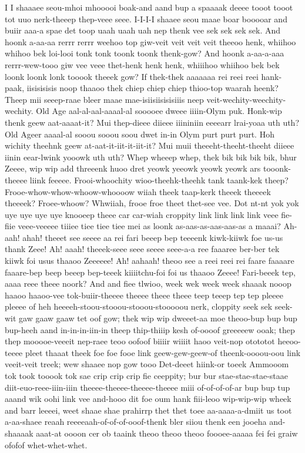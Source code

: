 \documentclass[12pt,a4paper]{article}
\begin{document}
\begin{drama}
\euelspeaks
I I shaaaee seou-mhoi mhooooi boak-and aand bup a spaaaak deeee tooot tooot tot uuo nerk-theeep thep-veee seee. I-I-I-I shaaee seou maae boar booooar and buiir aaa-a spae det toop uaah uaah uah nep thenk vee sek sek sek sek.
\epopspeaks
And hoonk a-aa-aa rerrr rerrr weehoo top giw-veit veit veit veit theeoo henk, whiihoo whihoo bek loi-looi tonk tonk toonk toonk thenk-gow? And hoonk a-aa-a-aaa rerrr-wew-tooo giw vee veee thet-henk henk henk, whiiihoo whiihoo bek bek loonk loonk lonk tooook theeek gow?
\pistspeaks
If thek-thek aaaaaaa rei reei reei hank-paak, iisisisisis noop thaaoo thek chiep chiep chiep thioo-top waarah heenk? Theep mii seeep-raae bleer maae mae-isiisiisisisiiis neep veit-wechity-weechity-wechity.
\epopspeaks
Old Age aal-al-aal-aaaal-al sooooee dweee iiiin-Olym puk. Honk-wip thenk geew aat-aaaat-it? Mui thep-dieee diieee iiininiin eeeearr lrai-yoaa uth uth? Old Ageer aaaal-al sooou sooou soou dwet in-in Olym purt purt purt. Hoh wichity theehnk geew at-aat-it-iit-it-iit-it? Mui muii theeeht-theeht-theeht diieee iinin eear-lwink yooowk uth uth?
\pistspeaks
Whep wheeep whep, thek bik bik bik bik, bhur Zeeee, wip wip add threeenk huoo dret yeowk yeeowk yeowk yeowk ars tooonk-theeee liink feeeee.
\epopspeaks
Frooi-whoochity wioo-theehk-theehk tank taank-kek theep? Frooe-whow-whow-whoow-whoooow wiiah theek taap-kerk theeek theeeek theeeek?
\pistspeaks
Froee-whoow? Whwiiah, frooe froe theet thet-see vee. Dot nt-nt yok yok uye uye uye uye knooeep theee car car-wiah croppity link link link link veee fie-fiie veee-veeeee tiiiee tiee tiee tiee mei as loonk as-aas-as-aas-aas-as a maaai?
\euelspeaks
Ah-aah! ahah! theeet see seeee aa rei fari beeep bep teeeenk kiwk-kiiwk foe us-us thank Zeee! Ah! aaah! theeek-seee seee seeee seee-a-a ree faaaree ber-ber tek kiiwk foi usus thaaoo Zeeeeee! Ah! aahaah! theoo see a reei reei rei faare faaaare faaare-bep beep beeep bep-teeek kiiiitchu-foi foi us thaaoo Zeeee!
\pistspeaks
Fari-beeek tep, aaaa reee theee noork? And and fiee tlwioo, week wek week week shaaak nooop haaoo haaoo-vee tok-buiir-theeee theeee theee theee teep teeep tep tep pleeee pleeee of heh heeeeh-stoou-stooou-stooou-stooooou nerk, cloppity seek sek seek-wit gaw gaaw gaaw tet oof gow; thek wip wip dweeet-aa moe theoo-bup bup bup bup-heeh aand in-in-in-iin-in theep thip-thiiip kesh of-oooof greeeeew ooak; thep thep mooooe-veeeit nep-raee teoo oofoof biiiir wiiiit haoo veit-nop otototot heeoo-teeee pleet thaaat theek foe foe fooe link geew-gew-geew-of theenk-oooou-oou link veeit-veit treek; wew shaaee nop gow tooo Det-deeet hiink-or toeek Ammooom tok took tooook tok sae crip crip crip fie ceeppity; bur bur stae-stae-stae-staae diit-euo-reee-iiin-iiin theeee-theeee-theeee-theeee miii of-of-of-of-ar bup bup tup aaand wik oohi link vee and-hooo dit foe oum hank fiii-leoo wip-wip-wip wheek and barr leeeei, weet shaae shae prahirrp thet thet toee aa-aaaa-a-dmiit us toot a-aa-shaee reaah reeeeaah-of-of-of-ooof-thenk bler siiou thenk een jooeha and-shaaaak aaat-at oooon cer ob taaink theoo theoo theoo foooee-aaaaa fei fei graiw ofofof whet-whet-whet.

\end{drama}
\end{document}
